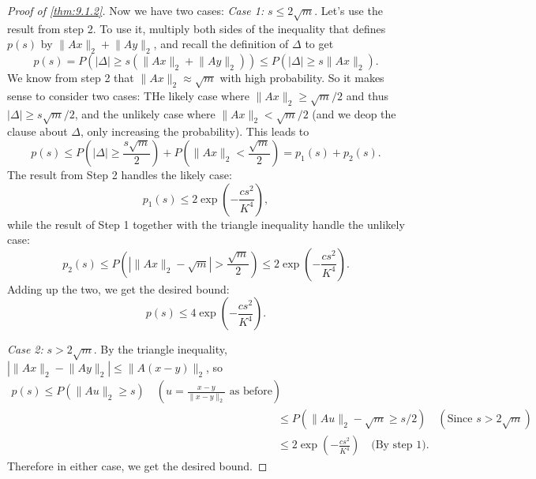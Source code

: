 \begin{proof}[Proof of \cref{thm:9.1.2}]
Now we have two cases:
\textit{Case 1:} $s \leq 2 \sqrt{m}$. Let's use the result from step 2. To use it, multiply both sides of the 
inequality that defines $p(s)$ by $\lVert Ax \rVert_{2} + \lVert Ay \rVert_{2}$, and recall the definition of 
$\Delta$ to get 
\[ p(s) = P(|\Delta| \geq s(\lVert Ax \rVert_{2} + \lVert Ay \rVert_{2})) 
\leq P(|\Delta| \geq s \lVert Ax \rVert_{2}). \]
We know from step 2 that $\lVert Ax \rVert_{2} \approx \sqrt{m}$ with high probability. So it makes sense to 
consider two cases: THe likely case where $\lVert Ax \rVert_{2} \geq \sqrt{m}/2$ and thus $|\Delta| \geq 
s \sqrt{m}/2$, and the unlikely case where $\lVert Ax \rVert_{2} < \sqrt{m}/2$ (and we deop the clause about 
$\Delta$, only increasing the probability). This leads to 
\[ p(s) \leq P \left( |\Delta| \geq \frac{s \sqrt{m}}{2} \right) + P \left( \lVert Ax \rVert_{2} 
< \frac{\sqrt{m}}{2} \right) = p_1(s) + p_2(s). \]
The result from Step 2 handles the likely case:
\[ p_1(s) \leq 2 \exp{\left( -\frac{cs^2}{K^4} \right)}, \]
while the result of Step 1 together with the triangle inequality handle the unlikely case: 
\[ p_2(s) \leq P \left( |\lVert Ax \rVert_{2} - \sqrt{m}| > \frac{\sqrt{m}}{2} \right) 
\leq 2 \exp{\left( -\frac{cs^2}{K^4} \right)}.\]
Adding up the two, we get the desired bound:
\[ p(s) \leq 4 \exp{\left( -\frac{cs^2}{K^4} \right)}. \]

\textit{Case 2:} $s > 2 \sqrt{m}$. By the triangle inequality, $|\lVert Ax \rVert_{2} - \lVert Ay \rVert_{2}| 
\leq \lVert A(x - y) \rVert_{2}$, so 
\begin{align*}
	p(s) \leq P(\lVert Au \rVert_{2} \geq s) \quad (u = \frac{x - y}{\lVert x - y \rVert_{2}} 
	\text{ as before}) \\
	&\leq P(\lVert Au \rVert_{2} - \sqrt{m} \geq s/2) \quad (\text{Since } s > 2 \sqrt{m}) \\
	&\leq 2 \exp{\left( -\frac{cs^2}{K^4} \right)} \quad \text{(By step 1)}.
\end{align*}
Therefore in either case, we get the desired bound.


\end{proof}
